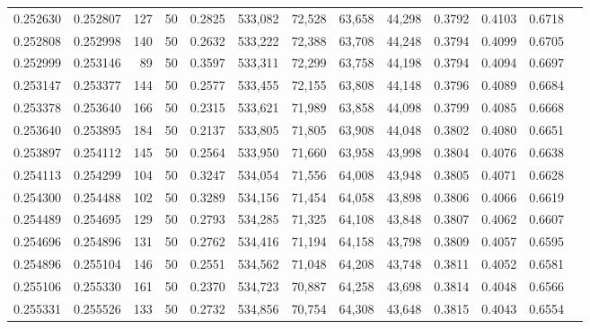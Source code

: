 \begin{tabular}{rrrrrrrrrrrrr}
0.252630 & 0.252807 &   127 &  50 &                                     0.2825 & 533,082 &  72,528 &  63,658 &  44,298 & 0.3792 & 0.4103 & 0.6718 \\
0.252808 & 0.252998 &   140 &  50 &                                     0.2632 & 533,222 &  72,388 &  63,708 &  44,248 & 0.3794 & 0.4099 & 0.6705 \\
0.252999 & 0.253146 &    89 &  50 &                                     0.3597 & 533,311 &  72,299 &  63,758 &  44,198 & 0.3794 & 0.4094 & 0.6697 \\
0.253147 & 0.253377 &   144 &  50 &                                     0.2577 & 533,455 &  72,155 &  63,808 &  44,148 & 0.3796 & 0.4089 & 0.6684 \\
0.253378 & 0.253640 &   166 &  50 &                                     0.2315 & 533,621 &  71,989 &  63,858 &  44,098 & 0.3799 & 0.4085 & 0.6668 \\
0.253640 & 0.253895 &   184 &  50 &                                     0.2137 & 533,805 &  71,805 &  63,908 &  44,048 & 0.3802 & 0.4080 & 0.6651 \\
0.253897 & 0.254112 &   145 &  50 &                                     0.2564 & 533,950 &  71,660 &  63,958 &  43,998 & 0.3804 & 0.4076 & 0.6638 \\
0.254113 & 0.254299 &   104 &  50 &                                     0.3247 & 534,054 &  71,556 &  64,008 &  43,948 & 0.3805 & 0.4071 & 0.6628 \\
0.254300 & 0.254488 &   102 &  50 &                                     0.3289 & 534,156 &  71,454 &  64,058 &  43,898 & 0.3806 & 0.4066 & 0.6619 \\
0.254489 & 0.254695 &   129 &  50 &                                     0.2793 & 534,285 &  71,325 &  64,108 &  43,848 & 0.3807 & 0.4062 & 0.6607 \\
0.254696 & 0.254896 &   131 &  50 &                                     0.2762 & 534,416 &  71,194 &  64,158 &  43,798 & 0.3809 & 0.4057 & 0.6595 \\
0.254896 & 0.255104 &   146 &  50 &                                     0.2551 & 534,562 &  71,048 &  64,208 &  43,748 & 0.3811 & 0.4052 & 0.6581 \\
0.255106 & 0.255330 &   161 &  50 &                                     0.2370 & 534,723 &  70,887 &  64,258 &  43,698 & 0.3814 & 0.4048 & 0.6566 \\
0.255331 & 0.255526 &   133 &  50 &                                     0.2732 & 534,856 &  70,754 &  64,308 &  43,648 & 0.3815 & 0.4043 & 0.6554 \\

\end{tabular}
